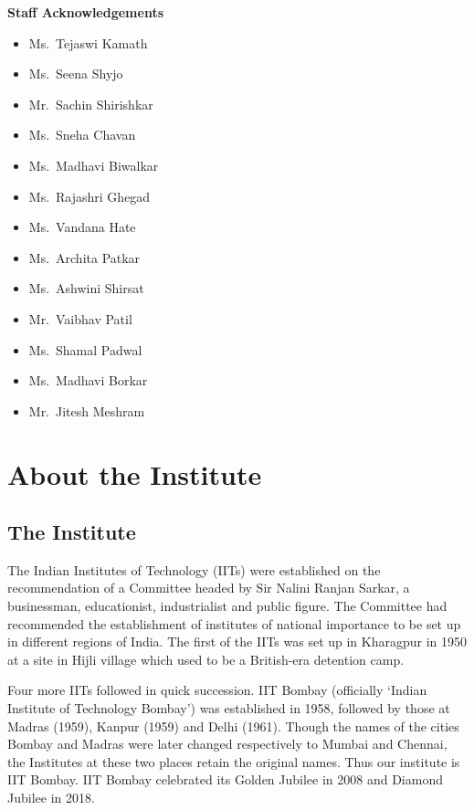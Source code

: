 \documentclass[
  10pt,
  a5paper,
  10pt,
  openany]{amsbook}
\providecommand{\tightlist}{%
  \setlength{\itemsep}{0pt}\setlength{\parskip}{0pt}}
\begin{document}
\textbf{Staff Acknowledgements}

\begin{itemize}
\tightlist
\item
  Ms.~Tejaswi Kamath
\item
  Ms.~Seena Shyjo
\item
  Mr.~Sachin Shirishkar
\item
  Ms.~Sneha Chavan
\item
  Ms.~Madhavi Biwalkar
\item
  Ms.~Rajashri Ghegad
\item
  Ms.~Vandana Hate
\item
  Ms.~Archita Patkar
\item
  Ms.~Ashwini Shirsat
\item
  Mr.~Vaibhav Patil
\item
  Ms.~Shamal Padwal
\item
  Ms.~Madhavi Borkar
\item
  Mr.~Jitesh Meshram
\end{itemize}

\clearpage

\restoregeometry
\normalsize

\part{About the Institute}

\chapter{The Institute}\label{the-institute}

The Indian Institutes of Technology (IITs) were established on the
recommendation of a Committee headed by Sir Nalini Ranjan Sarkar, a
businessman, educationist, industrialist and public figure. The
Committee had recommended the establishment of institutes of national
importance to be set up in different regions of India. The first of the
IITs was set up in Kharagpur in 1950 at a site in Hijli village which
used to be a British-era detention camp.

Four more IITs followed in quick succession. IIT Bombay (officially
`Indian Institute of Technology Bombay') was established in 1958,
followed by those at Madras (1959), Kanpur (1959) and Delhi (1961).
Though the names of the cities Bombay and Madras were later changed
respectively to Mumbai and Chennai, the Institutes at these two places
retain the original names. Thus our institute is IIT Bombay. IIT Bombay
celebrated its Golden Jubilee in 2008 and Diamond Jubilee in 2018.
\end{document}
